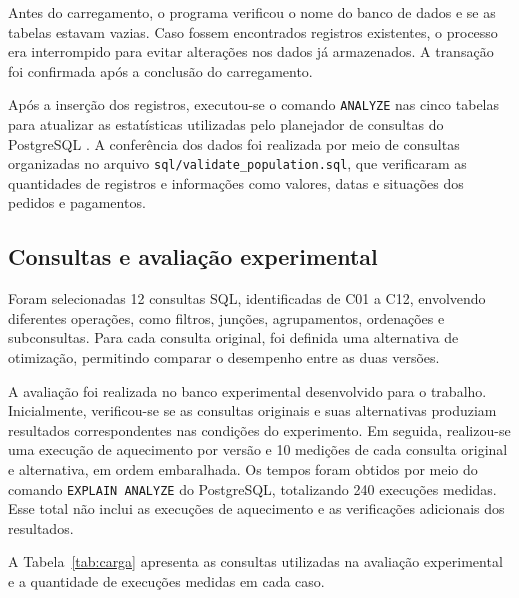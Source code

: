 \documentclass{UNESC}
\newcommand{\codigo}[1]{\texttt{#1}}
\begin{document}
Antes do carregamento, o programa verificou o nome do banco de dados e se as tabelas estavam vazias. Caso fossem encontrados registros existentes, o processo era interrompido para evitar alterações nos dados já armazenados. A transação foi confirmada após a conclusão do carregamento.

Após a inserção dos registros, executou-se o comando \codigo{ANALYZE} nas cinco tabelas para atualizar as estatísticas utilizadas pelo planejador de consultas do PostgreSQL \cite{postgresql2025populate}. A conferência dos dados foi realizada por meio de consultas organizadas no arquivo \codigo{sql/validate\_population.sql}, que verificaram as quantidades de registros e informações como valores, datas e situações dos pedidos e pagamentos.

\subsection{Consultas e avaliação experimental}

Foram selecionadas 12 consultas SQL, identificadas de C01 a C12, envolvendo diferentes operações, como filtros, junções, agrupamentos, ordenações e subconsultas. Para cada consulta original, foi definida uma alternativa de otimização, permitindo comparar o desempenho entre as duas versões.

A avaliação foi realizada no banco experimental desenvolvido para o trabalho. Inicialmente, verificou-se se as consultas originais e suas alternativas produziam resultados correspondentes nas condições do experimento. Em seguida, realizou-se uma execução de aquecimento por versão e 10 medições de cada consulta original e alternativa, em ordem embaralhada. Os tempos foram obtidos por meio do comando \codigo{EXPLAIN ANALYZE} do PostgreSQL, totalizando 240 execuções medidas. Esse total não inclui as execuções de aquecimento e as verificações adicionais dos resultados.

A Tabela~\ref{tab:carga} apresenta as consultas utilizadas na avaliação experimental e a quantidade de execuções medidas em cada caso.
\end{document}
